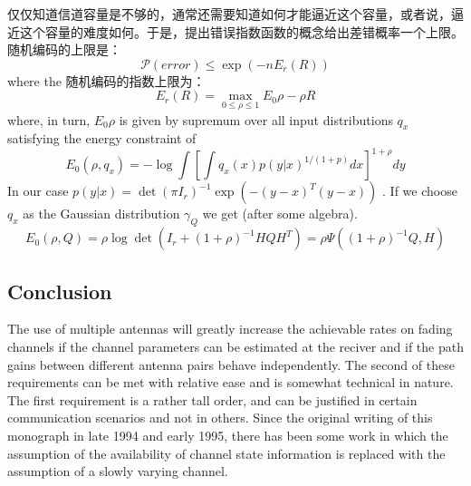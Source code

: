 \documentclass[10pt,a4paper,UTF8]{article}
\begin{document}
仅仅知道信道容量是不够的，通常还需要知道如何才能逼近这个容量，或者说，逼近这个容量的难度如何。于是，提出错误指数函数的概念给出差错概率一个上限。随机编码的上限是：
\begin{equation}
  \label{eq:20120323perror}
  \mathcal{P}(error) \le \exp(-nE_r(R))
\end{equation}
where the 随机编码的指数上限为：
\begin{equation}
  \label{eq:20120323err}
  E_r(R) = \max_{0\le \rho\le 1} E_0{\rho} -\rho R
\end{equation}
where, in turn, \(E_0{\rho}\) is given by supremum over all input distributions \(q_x\) satisfying the energy constraint of 
\begin{equation}
  \label{eq:20120323E0rhoqx}
  E_0(\rho, q_x) = -\log \int[\int q_x(x)p(y|x)^{1/(1+p)}dx]^{1+\rho} dy
\end{equation}
In our case \(p(y|x)=\det(\pi I_r)^{-1} \exp(-(y-x)^{T}(y-x))\) . If we choose \(q_x\) as the Gaussian distribution \(\gamma_Q\) we get (after some algebra).
\begin{equation}
  \label{eq:20120323E0rhoQ}
  E_0(\rho, Q) = \rho \log\det(I_r + (1+\rho)^{-1} HQH^{T}) = \rho\Psi((1+\rho)^{-1}Q,H)
\end{equation}

\subsection{Conclusion}
\label{sec:orgb8ac1f0}
The use of multiple antennas will greatly increase the achievable rates on fading channels if the channel parameters can be estimated at the reciver and if the path gains between different antenna pairs behave independently. The second of these requirements can be met with relative ease and is somewhat technical in nature. The first requirement is a rather tall order, and can be justified in certain communication scenarios and not in others. Since the original writing of this monograph in late 1994 and early 1995, there has been some work in which the assumption of the availability of channel state information is replaced with the assumption of a slowly varying channel.
\end{document}
